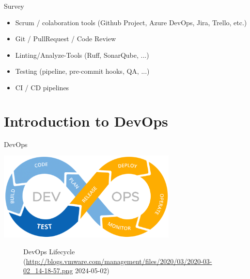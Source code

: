 \documentclass[10pt]{beamer}
\begin{document}
\begin{frame}{Survey}
	\begin{itemize}
		\item Scrum / colaboration tools (Github Project, Azure DevOps, Jira, Trello, etc.)
		\item Git / PullRequest / Code Review
		\item Linting/Analyze-Tools (Ruff, SonarQube, ...)
		\item Testing (pipeline, pre-commit hooks, QA, ...)
		\item CI / CD pipelines
	\end{itemize}
\end{frame}

\section{Introduction to DevOps}
\begin{frame}{DevOps}
    \begin{center}
        \includegraphics[width=9cm]{devops_lifecycle.png}
        \begin{figure}
            \caption{DevOps Lifecycle (\url{http://blogs.vmware.com/management/files/2020/03/2020-03-02_14-18-57.png} 2024-05-02)}
        \end{figure}
    \end{center}
\end{frame}

\end{document}
